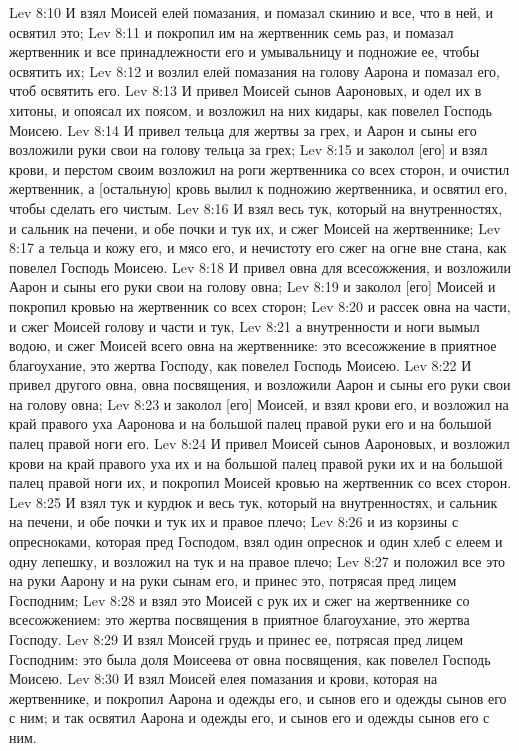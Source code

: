 Lev 8:10  И взял Моисей елей помазания, и помазал скинию и все, что в ней, и освятил это;
Lev 8:11  и покропил им на жертвенник семь раз, и помазал жертвенник и все принадлежности его и умывальницу и подножие ее, чтобы освятить их;
Lev 8:12  и возлил елей помазания на голову Аарона и помазал его, чтоб освятить его.
Lev 8:13  И привел Моисей сынов Аароновых, и одел их в хитоны, и опоясал их поясом, и возложил на них кидары, как повелел Господь Моисею.
Lev 8:14  И привел тельца для жертвы за грех, и Аарон и сыны его возложили руки свои на голову тельца за грех;
Lev 8:15  и заколол [его] и взял крови, и перстом своим возложил на роги жертвенника со всех сторон, и очистил жертвенник, а [остальную] кровь вылил к подножию жертвенника, и освятил его, чтобы сделать его чистым.
Lev 8:16  И взял весь тук, который на внутренностях, и сальник на печени, и обе почки и тук их, и сжег Моисей на жертвеннике;
Lev 8:17  а тельца и кожу его, и мясо его, и нечистоту его сжег на огне вне стана, как повелел Господь Моисею.
Lev 8:18  И привел овна для всесожжения, и возложили Аарон и сыны его руки свои на голову овна;
Lev 8:19  и заколол [его] Моисей и покропил кровью на жертвенник со всех сторон;
Lev 8:20  и рассек овна на части, и сжег Моисей голову и части и тук,
Lev 8:21  а внутренности и ноги вымыл водою, и сжег Моисей всего овна на жертвеннике: это всесожжение в приятное благоухание, это жертва Господу, как повелел Господь Моисею.
Lev 8:22  И привел другого овна, овна посвящения, и возложили Аарон и сыны его руки свои на голову овна;
Lev 8:23  и заколол [его] Моисей, и взял крови его, и возложил на край правого уха Ааронова и на большой палец правой руки его и на большой палец правой ноги его.
Lev 8:24  И привел Моисей сынов Аароновых, и возложил крови на край правого уха их и на большой палец правой руки их и на большой палец правой ноги их, и покропил Моисей кровью на жертвенник со всех сторон.
Lev 8:25  И взял тук и курдюк и весь тук, который на внутренностях, и сальник на печени, и обе почки и тук их и правое плечо;
Lev 8:26  и из корзины с опресноками, которая пред Господом, взял один опреснок и один хлеб с елеем и одну лепешку, и возложил на тук и на правое плечо;
Lev 8:27  и положил все это на руки Аарону и на руки сынам его, и принес это, потрясая пред лицем Господним;
Lev 8:28  и взял это Моисей с рук их и сжег на жертвеннике со всесожжением: это жертва посвящения в приятное благоухание, это жертва Господу.
Lev 8:29  И взял Моисей грудь и принес ее, потрясая пред лицем Господним: это была доля Моисеева от овна посвящения, как повелел Господь Моисею.
Lev 8:30  И взял Моисей елея помазания и крови, которая на жертвеннике, и покропил Аарона и одежды его, и сынов его и одежды сынов его с ним; и так освятил Аарона и одежды его, и сынов его и одежды сынов его с ним.
